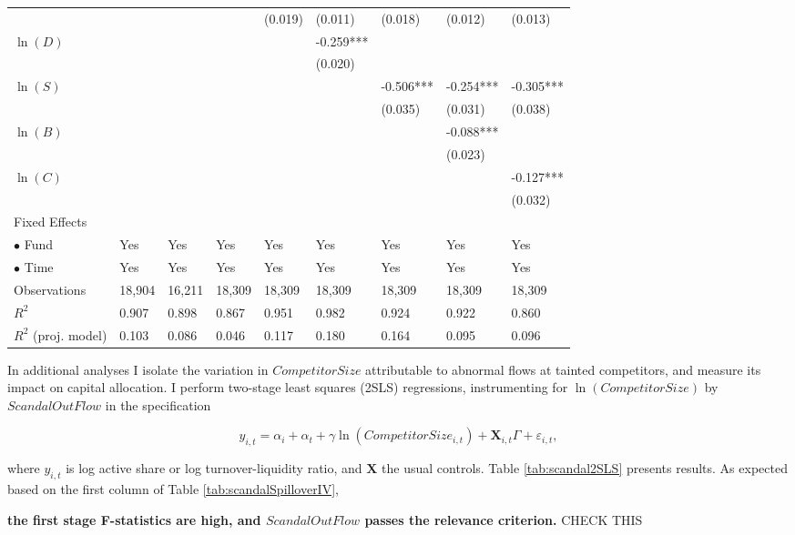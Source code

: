 \documentclass[openany]{book}
\theoremstyle{definition}
\theoremstyle{definition}
\theoremstyle{definition}
\theoremstyle{remark}
\begin{document}
\begin{table}[ht]
\begin{tabularx}{0.975\textwidth}{lYYYYYYYY}
   &  &  &  & (0.019) & (0.011) & (0.018) & (0.012) & (0.013) \\ 
  $\ln(D)$ &  &  &  &  & -0.259*** &  &  &  \\ 
   &  &  &  &  & (0.020) &  &  &  \\ 
  $\ln(S)$ &  &  &  &  &  & -0.506*** & -0.254*** & -0.305*** \\ 
   &  &  &  &  &  & (0.035) & (0.031) & (0.038) \\ 
  $\ln(B)$ &  &  &  &  &  &  & -0.088*** &  \\ 
   &  &  &  &  &  &  & (0.023) &  \\ 
  $\ln(C)$ &  &  &  &  &  &  &  & -0.127*** \\ 
   &  &  &  &  &  &  &  & (0.032) \\ 
  Fixed Effects &  &  &  &  &  &  &  &  \\ 
  $\bullet$ Fund & Yes & Yes & Yes & Yes & Yes & Yes & Yes & Yes \\ 
  $\bullet$ Time & Yes & Yes & Yes & Yes & Yes & Yes & Yes & Yes \\ 
  Observations & 18,904 & 16,211 & 18,309 & 18,309 & 18,309 & 18,309 & 18,309 & 18,309 \\ 
  $R^2$ & 0.907 & 0.898 & 0.867 & 0.951 & 0.982 & 0.924 & 0.922 & 0.860 \\ 
  $R^2$ (proj. model) & 0.103 & 0.086 & 0.046 & 0.117 & 0.180 & 0.164 & 0.095 & 0.096 \\ 
   \bottomrule
\end{tabularx}
\endgroup
\end{table}

In additional analyses I isolate the variation in \(CompetitorSize\)
attributable to abnormal flows at tainted competitors, and measure its
impact on capital allocation. I perform two-stage least squares (2SLS)
regressions, instrumenting for \(\ln(CompetitorSize)\) by
\(ScandalOutFlow\) in the specification

\begin{equation}
    y_{i,t}=\alpha_i+\alpha_t + \gamma \ln(CompetitorSize_{i,t}) + \mathbf{X}_{i,t}\Gamma+\varepsilon_{i,t},
\end{equation}

where \(y_{i,t}\) is log active share or log turnover-liquidity ratio,
and \(\mathbf{X}\) the usual controls. Table \ref{tab:scandal2SLS}
presents results. As expected based on the first column of Table
\ref{tab:scandalSpilloverIV},

\textbf{the first stage F-statistics are high, and \(ScandalOutFlow\)
passes the relevance criterion.} CHECK THIS
\end{document}
